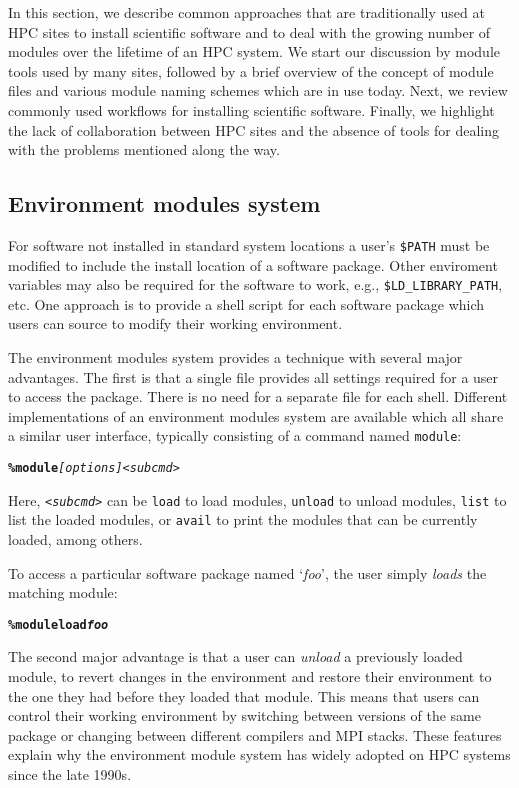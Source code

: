 In this section, we describe common approaches that are traditionally
used at HPC sites to install scientific software and to deal with the
growing number of modules over the lifetime of an HPC system. We start
our discussion by module tools used by many sites, followed by a brief
overview of the concept of module files and various module naming
schemes which are in use today.  Next, we review commonly used
workflows for installing scientific software. Finally,
we highlight the lack of collaboration between HPC sites and the absence
of tools for dealing with the problems mentioned along the way.

\subsection{Environment modules system}
\label{sec:env_modules_system}

For software not installed in standard system locations a user's
\texttt{\small\$PATH} must be modified to include the install location of a
software package.  Other enviroment variables may also be required for the
software to work, e.g., \texttt{\small\$LD\_LIBRARY\_PATH}, etc.
One approach is to provide a shell script for each software package which
users can source to modify their working environment.

The environment modules system provides a technique with several major
advantages. The first is that a single file provides all settings
required for a user to access the package.  There is no need for a
separate file for each shell. Different implementations of an
environment modules system are available which all share a similar
user interface, typically consisting of a command named \texttt{\small module}:
{\small
\begin{alltt}
    \textbf{\% module} \emph{[options]} \emph{<subcmd>}\
\end{alltt}
}
\noindent
Here, \emph{\texttt{\small<subcmd>}} can be \texttt{\small load} to load modules,
\texttt{\small unload} to unload modules, \texttt{\small list} to list the loaded
modules, or \texttt{\small avail} to print the modules that can be currently
loaded, among others.

To access a particular software package named `\emph{foo}', the user simply
\emph{loads} the matching module:
{\small
\begin{alltt}
    \textbf{\% module load \emph{foo}}\
\end{alltt}
}
\noindent
The second major advantage is that a user can \emph{unload} a previously
loaded module, to revert changes in the environment and restore their
environment to the one they had before they loaded that module.  This means
that users can control their working environment by switching between
versions of the same package or changing between different compilers and
MPI stacks.  These features explain why the environment module
system has widely adopted on HPC systems since the late 1990s.


